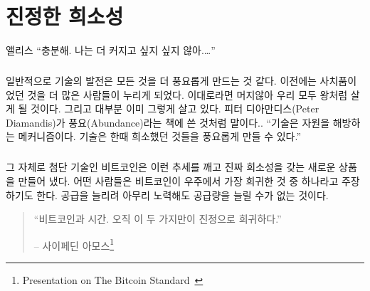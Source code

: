 
\chapter{진정한 희소성}
\label{les:2}

\begin{chapquote}{앨리스}
	\enquote{충분해. 나는 더 커지고 싶지 싶지 않아.\ldots}
\end{chapquote}


\paragraph{}
일반적으로 기술의 발전은 모든 것을 더 풍요롭게 만드는 것 같다. 이전에는 사치품이었던 것을 더 많은 사람들이 누리게 되었다. 
이대로라면 머지않아 우리 모두 왕처럼 살게 될 것이다. 그리고 대부분 이미 그렇게 살고 있다.
피터 디아만디스(Peter Diamandis)가 풍요(Abundance)라는 책에 쓴 것처럼 말이다.\cite{abundance}. \enquote{기술은 자원을 해방하는 메커니즘이다.
	기술은 한때 희소했던 것들을 풍요롭게 만들 수 있다.}

\paragraph{}
그 자체로 첨단 기술인 비트코인은 이런 추세를 깨고 진짜 희소성을 갖는 새로운 상품을 만들어 냈다. 
어떤 사람들은 비트코인이 우주에서 가장 희귀한 것 중 하나라고 주장하기도 한다.
공급을 늘리려 아무리 노력해도 공급량을 늘릴 수가 없는 것이다. 

\begin{quotation}\begin{samepage}
		\enquote{비트코인과 시간. 오직 이 두 가지만이 진정으로 희귀하다.}
		\begin{flushright} -- 사이페딘 아모스\footnote{Presentation on The Bitcoin Standard~\cite{bitcoinstandard-pres}}
\end{flushright}\end{samepage}\end{quotation}

